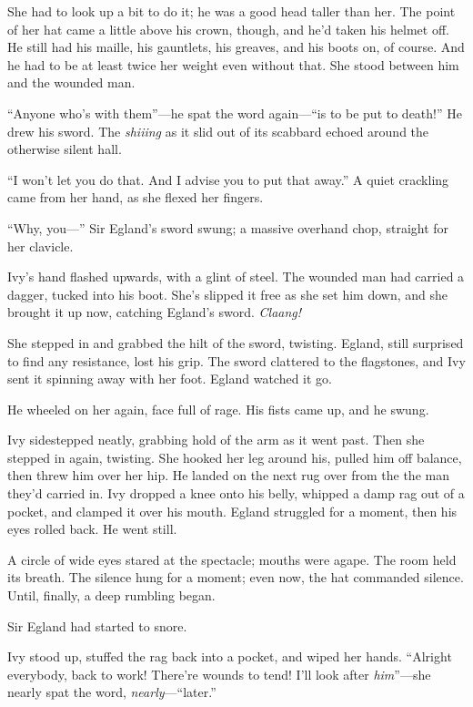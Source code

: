 She had to look up a bit to do it; he was a good head taller than her.
The point of her hat came a little above his crown, though, and he'd taken his helmet off.
He still had his maille, his gauntlets, his greaves, and his boots on, of course.
And he had to be at least twice her weight even without that.
She stood between him and the wounded man.

``Anyone who's with them''---he spat the word again---``is to be put to death!''
He drew his sword.
The \emph{shiiing} as it slid out of its scabbard echoed around the otherwise silent hall.

``I won't let you do that.
And I advise you to put that away.''
A quiet crackling came from her hand, as she flexed her fingers.

``Why, you---''
Sir Egland's sword swung; a massive overhand chop, straight for her clavicle.

Ivy's hand flashed upwards, with a glint of steel.
The wounded man had carried a dagger, tucked into his boot.
She's slipped it free as she set him down, and she brought it up now, catching Egland's sword.
\emph{Claang!}

She stepped in and grabbed the hilt of the sword, twisting.
Egland, still surprised to find any resistance, lost his grip.
The sword clattered to the flagstones, and Ivy sent it spinning away with her foot.
Egland watched it go.

He wheeled on her again, face full of rage.
His fists came up, and he swung.

Ivy sidestepped neatly, grabbing hold of the arm as it went past.
Then she stepped in again, twisting.
She hooked her leg around his, pulled him off balance, then threw him over her hip.
He landed on the next rug over from the the man they'd carried in.
Ivy dropped a knee onto his belly, whipped a damp rag out of a pocket, and clamped it over his mouth.
Egland struggled for a moment, then his eyes rolled back.
He went still.

A circle of wide eyes stared at the spectacle; mouths were agape.
The room held its breath.
The silence hung for a moment; even now, the hat commanded silence.
Until, finally, a deep rumbling began.

Sir Egland had started to snore.

Ivy stood up, stuffed the rag back into a pocket, and wiped her hands.
``Alright everybody, back to work!
There're wounds to tend!
I'll look after \emph{him}''---she nearly spat the word, \emph{nearly}---``later.''

